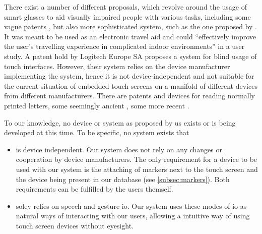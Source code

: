 There exist a number of different proposals, which revolve around the usage of smart glasses to aid visually impaired people with various tasks, including some vague patents \autocite{smartglasses, smartglasses2, smartglasses3}, but also more sophisticated system, such as the one proposed by \textcite{bai2017smart}.
It was meant to be used as an electronic travel aid and could \enquote{effectively improve the user's travelling experience in complicated indoor environments} in a user study.
A patent hold by Logitech Europe SA \autocite{logitech} proposes a system for blind usage of touch interfaces.
However, their system relies on the device manufacturer implementing the system, hence it is not device-independent and not suitable for the current situation of embedded touch screens on a manifold of different devices from different manufacturers.
There are patents and devices for reading normally printed letters, some seemingly ancient \cite{ring}, some more recent \cite{ring2}.

To our knowledge, no device or system as proposed by us exists or is being developed at this time.
To be specific, no system exists that 
\begin{itemize}
	\item
		is device independent.
		Our system does not rely on any changes or cooperation by device manufacturers.
		The only requirement for a device to be used with our system is the attaching of markers next to the touch screen and the device being present in our database (see \autoref{subsec:markers}).
		Both requirements can be fulfilled by the users themself.
	\item
		soley relies on speech and gesture \ac{io}.
		Our system uses these modes of \ac{io} as natural ways of interacting with our users, allowing a intuitive way of using touch screen devices without eyesight.
\end{itemize}




